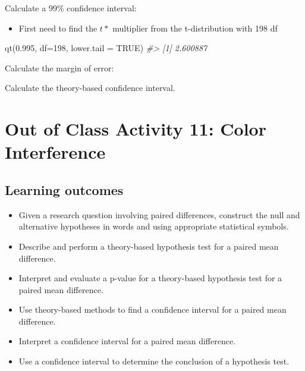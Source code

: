 \documentclass[
]{report}
\newenvironment{Shaded}{\begin{snugshade}}{\end{snugshade}}
\newcommand{\AttributeTok}[1]{\textcolor[rgb]{0.77,0.63,0.00}{#1}}
\newcommand{\CommentTok}[1]{\textcolor[rgb]{0.56,0.35,0.01}{\textit{#1}}}
\newcommand{\ConstantTok}[1]{\textcolor[rgb]{0.00,0.00,0.00}{#1}}
\newcommand{\DecValTok}[1]{\textcolor[rgb]{0.00,0.00,0.81}{#1}}
\newcommand{\FloatTok}[1]{\textcolor[rgb]{0.00,0.00,0.81}{#1}}
\newcommand{\FunctionTok}[1]{\textcolor[rgb]{0.00,0.00,0.00}{#1}}
\newcommand{\NormalTok}[1]{#1}
\providecommand{\tightlist}{%
  \setlength{\itemsep}{0pt}\setlength{\parskip}{0pt}}
\begin{document}
Calculate a 99\% confidence interval:

\begin{itemize}
\tightlist
\item
  First need to find the \(t*\) multiplier from the t-distribution with 198 df
\end{itemize}

\begin{Shaded}
\begin{Highlighting}[]
\FunctionTok{qt}\NormalTok{(}\FloatTok{0.995}\NormalTok{, }\AttributeTok{df=}\DecValTok{198}\NormalTok{, }\AttributeTok{lower.tail =} \ConstantTok{TRUE}\NormalTok{)}
\CommentTok{\#\textgreater{} [1] 2.600887}
\end{Highlighting}
\end{Shaded}

Calculate the margin of error:
\vspace{0.4in}

Calculate the theory-based confidence interval.
\vspace{0.5in}
\newpage

\hypertarget{out-of-class-activity-11-color-interference}{%
\section{Out of Class Activity 11: Color Interference}\label{out-of-class-activity-11-color-interference}}


\hypertarget{learning-outcomes-3}{%
\subsection{Learning outcomes}\label{learning-outcomes-3}}

\begin{itemize}
\item
  Given a research question involving paired differences, construct the null and alternative hypotheses
  in words and using appropriate statistical symbols.
\item
  Describe and perform a theory-based hypothesis test for a paired mean difference.
\item
  Interpret and evaluate a p-value for a theory-based hypothesis test for a paired mean difference.
\item
  Use theory-based methods to find a confidence interval for a paired mean difference.
\item
  Interpret a confidence interval for a paired mean difference.
\item
  Use a confidence interval to determine the conclusion of a hypothesis test.
\end{itemize}
\end{document}
